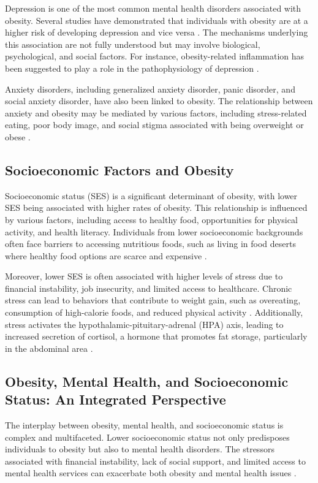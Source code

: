 \documentclass[runningheads]{llncs}
\begin{document}
Depression is one of the most common mental health disorders associated with obesity. Several studies have demonstrated that individuals with obesity are at a higher risk of developing depression and vice versa \cite{Faith2011}. The mechanisms underlying this association are not fully understood but may involve biological, psychological, and social factors. For instance, obesity-related inflammation has been suggested to play a role in the pathophysiology of depression \cite{Berk2013}.

Anxiety disorders, including generalized anxiety disorder, panic disorder, and social anxiety disorder, have also been linked to obesity. The relationship between anxiety and obesity may be mediated by various factors, including stress-related eating, poor body image, and social stigma associated with being overweight or obese \cite{Scott2008}.

\subsection{Socioeconomic Factors and Obesity}
Socioeconomic status (SES) is a significant determinant of obesity, with lower SES being associated with higher rates of obesity. This relationship is influenced by various factors, including access to healthy food, opportunities for physical activity, and health literacy. Individuals from lower socioeconomic backgrounds often face barriers to accessing nutritious foods, such as living in food deserts where healthy food options are scarce and expensive \cite{Drewnowski2004}.

Moreover, lower SES is often associated with higher levels of stress due to financial instability, job insecurity, and limited access to healthcare. Chronic stress can lead to behaviors that contribute to weight gain, such as overeating, consumption of high-calorie foods, and reduced physical activity \cite{Goodman2003}. Additionally, stress activates the hypothalamic-pituitary-adrenal (HPA) axis, leading to increased secretion of cortisol, a hormone that promotes fat storage, particularly in the abdominal area \cite{Charmandari2005}.

\subsection{Obesity, Mental Health, and Socioeconomic Status: An Integrated Perspective}
The interplay between obesity, mental health, and socioeconomic status is complex and multifaceted. Lower socioeconomic status not only predisposes individuals to obesity but also to mental health disorders. The stressors associated with financial instability, lack of social support, and limited access to mental health services can exacerbate both obesity and mental health issues \cite{Everson2002}.
\end{document}
